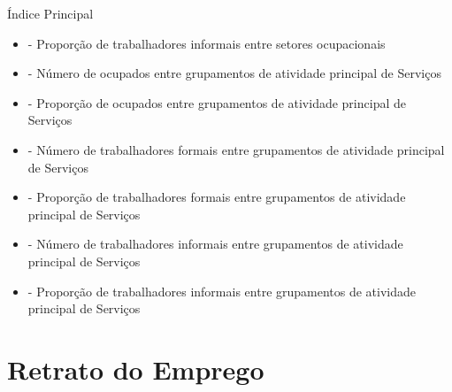 \documentclass[11pt]{beamer}
\begin{document}
\begin{frame}[label=indice_principal]{Índice Principal}
\begin{tiny}
\begin{itemize}
\item{
	\hyperlink{_retrato_emprego_pie_n_de_informal_gstr}{} - {\tiny Proporção de trabalhadores informais entre setores ocupacionais}
	}  	
	
\item{
	\hyperlink{_retrato_emprego_bar_n_de_ocupado_gstr}{} - {\tiny Número de ocupados entre grupamentos de atividade principal de Serviços}
	}  
		
		
\item{
	\hyperlink{_retrato_emprego_pie_n_de_ocupado_gape}{} - {\tiny Proporção de ocupados entre grupamentos de atividade principal de Serviços}
	}  
		
\item{
	\hyperlink{_retrato_emprego_bar_n_de_formal_gape}{} - {\tiny Número de trabalhadores formais entre grupamentos de atividade principal de Serviços}
	}  
		
		
\item{
	\hyperlink{_retrato_emprego_pie_n_de_formal_gape}{} - {\tiny Proporção de trabalhadores formais entre grupamentos de atividade principal de Serviços}
	}  
			

\item{
	\hyperlink{_retrato_emprego_bar_n_de_informal_gape}{} - {\tiny Número de trabalhadores informais entre grupamentos de atividade principal de Serviços}
	}  
		
\item{
	\hyperlink{_retrato_emprego_pie_n_de_informal_gape}{} - {\tiny Proporção de trabalhadores informais entre grupamentos de atividade principal de Serviços}
	}		
\end{itemize}
\end{tiny}
\end{frame}

\section{Retrato do Emprego}
\end{document}
